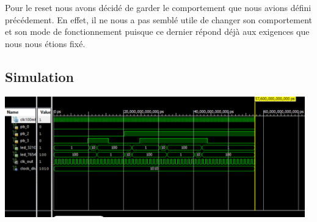 \documentclass[11pt]{report}
\begin{document}
  Pour le reset nous avons décidé de garder le comportement que nous avions défini précédement. En effet, il ne nous a pas semblé utile de changer son comportement et son mode de fonctionnement puisque ce dernier répond déjà aux exigences que nous nous étions fixé.

  \subsection{Simulation}

  \includegraphics[width=13cm]{TP03-4.png}
\end{document}
